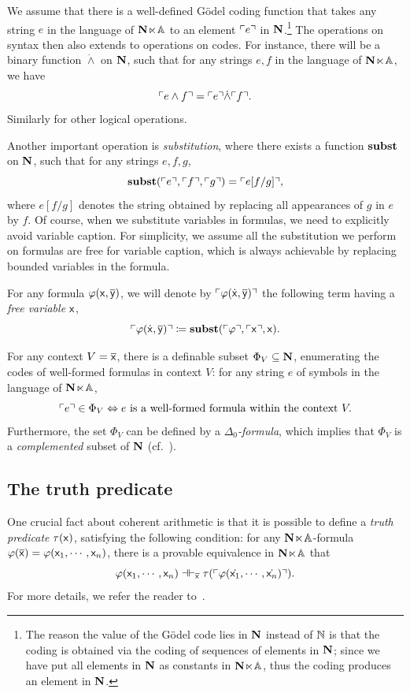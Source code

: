 We assume that there is a well-defined G\"odel coding function that takes any string $e$ in the language of $\mathbf N\hspace{-.4ex}\ltimes\hspace{-.4ex}\mathbb{A}$ to an element $\ulcorner e \urcorner$ in $\mathbf N$.\footnote{The reason the value of the G\"odel code lies in $\mathbf N$ instead of $\mathbb{N}$ is that the coding is obtained via the coding of sequences of elements in $\mathbf N$; since we have put all elements in $\mathbf N$ as constants in $\mathbf N\hspace{-.4ex}\ltimes\hspace{-.4ex}\mathbb{A}$, thus the coding produces an element in $\mathbf N$.} The operations on syntax then also extends to operations on codes. For instance, there will be a binary function $\dot{\wedge}$ on $\mathbf N$, such that for any strings $e,f$ in the language of $\mathbf N\hspace{-.4ex}\ltimes\hspace{-.4ex}\mathbb{A}$, we have
\[ \ulcorner e \wedge f \urcorner = \ulcorner e \urcorner \dot\wedge \ulcorner f \urcorner. \]
Similarly for other logical operations. 

Another important operation is \emph{substitution}, where there exists a function $\mathbf{subst}$ on $\mathbf N$, such that for any strings $e,f,g$,
\[ \mathbf{subst}(\ulcorner e \urcorner,\ulcorner f \urcorner,\ulcorner g \urcorner) = \ulcorner e[f/g] \urcorner, \]
where $e[f/g]$ denotes the string obtained by replacing all appearances of $g$ in $e$ by $f$. Of course, when we substitute variables in formulas, we need to explicitly avoid variable caption. For simplicity, we assume all the substitution we perform on formulas are free for variable caption, which is always achievable by replacing bounded variables in the formula. 

For any formula $\varphi(\mathsf{x},\overline{\mathsf{y}})$, we will denote by $\ulcorner \varphi(\dot{\mathsf{x}},\overline{\mathsf{y}}) \urcorner$ the following term having a \emph{free variable} $\mathsf{x}$,
\[ \ulcorner \varphi(\dot{\mathsf{x}},\overline{\mathsf{y}}) \urcorner \coloneq \mathbf{subst}(\ulcorner \varphi \urcorner,\ulcorner \mathsf{x} \urcorner,\mathsf{x}). \]

For any context $V = \overline{\mathsf{x}}$, there is a definable subset $\Phi_V \subseteq \mathbf N$, enumerating the codes of well-formed formulas in context $V$: for any string $e$ of symbols in the language of $\mathbf N\hspace{-.4ex}\ltimes\hspace{-.4ex}\mathbb{A}$,
\[ \ulcorner e \urcorner \in \Phi_V \Leftrightarrow e \text{ is a well-formed formula within the context } V. \]
Furthermore, the set $\Phi_V$ can be defined by a \emph{$\Delta_0$-formula}, which implies that $\Phi_V$ is a \emph{complemented} subset of $\mathbf N$ (cf.~).

\subsection{The truth predicate}\label{subsec:partialtruth}

One crucial fact about coherent arithmetic is that it is possible to define a \emph{truth predicate} $\tau(\mathsf{x})$, satisfying the following condition: for any $\mathbf N\hspace{-.4ex}\ltimes\hspace{-.4ex}\mathbb{A}$-formula $\varphi(\overline{\mathsf{x}}) = \varphi(\mathsf{x}_1,\cdots,\mathsf{x}_n)$, there is a provable equivalence in $\mathbf N\hspace{-.4ex}\ltimes\hspace{-.4ex}\mathbb{A}$ that
\[ \varphi(\mathsf{x}_1,\cdots,\mathsf{x}_n) \dashv\vdash_{\overline{\mathsf{x}}} \tau(\ulcorner \varphi(\dot{\mathsf{x}_1},\cdots,\dot{\mathsf{x}_n}) \urcorner). \]
For more details, we refer the reader to~\citet[Thm.~I.1.75 \& Cor.~I.1.76]{Hájek_Pudlák_2017}.

